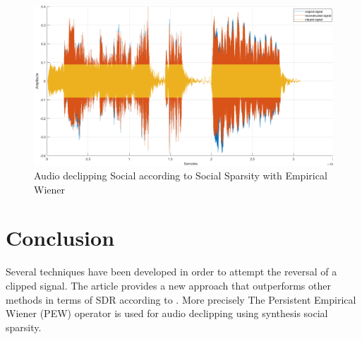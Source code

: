 \documentclass{article}
\numberwithin{dummy}{section}
\begin{document}
\begin{figure}[ht!]
    \centering
    \includegraphics[scale=0.3]{figures/PEW.png}
    \caption{Audio declipping Social according to Social Sparsity with Empirical Wiener}
    \label{PEW}
\end{figure}
\section{Conclusion}
Several techniques have been developed in order to attempt the reversal of a clipped signal.
The article \cite{gaultier:tel-02148598} provides a new approach that outperforms other methods in terms of SDR according to \cite{záviška2020survey}. More precisely The Persistent Empirical Wiener (PEW) operator is used for audio declipping using synthesis social sparsity.
\printbibliography
\end{document}
